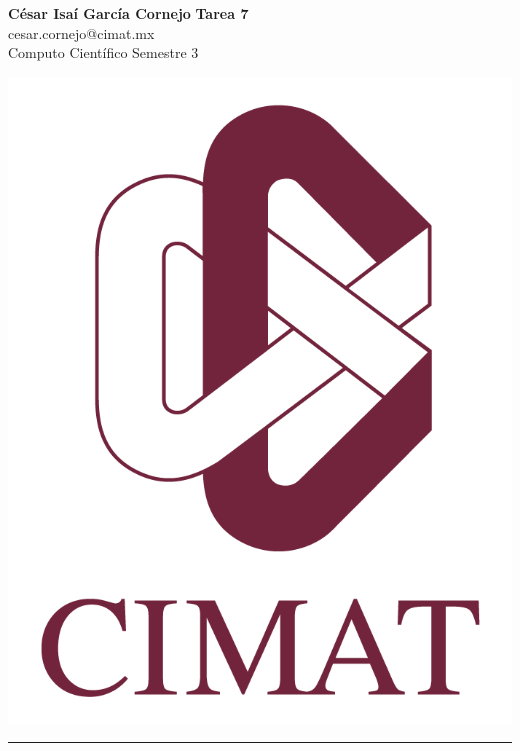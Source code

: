 \documentclass[a4paper, 11pt]{article}
\begin{document}
	\noindent
	
	\begin{minipage}[b][1.2cm][t]{0.8\textwidth}
		\large\textbf{César Isaí García Cornejo} \hfill \textbf{Tarea 7}  \\
		cesar.cornejo@cimat.mx \hfill \\
		\normalsize Computo Científico \hfill Semestre 3\\
	\end{minipage}
	
	\hspace{14.4cm}
	\begin{minipage}[b][0.03cm][t]{0.12\linewidth}
		
		\vspace{-2.2cm}
		\includegraphics[scale=0.3]{Figures/EscudoCimat.png}
	\end{minipage}
	
	\noindent\rule{7in}{2.8pt}
	
\end{document}
